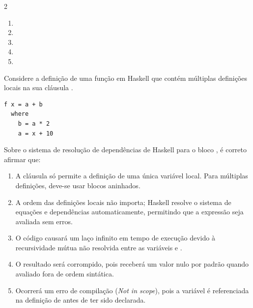 \documentclass[a4paper,10pt,brazil]{article}
\begin{document}
\begin{multicols}{2}
\begin{enumerate}
  \item {}

  \item {}

  \item {}
  \item {}

  \item {}


\end{enumerate}

Considere a definição de uma função  em Haskell que contém múltiplas definições locais na sua cláusula . 
\begin{verbatim}
f x = a + b
  where
    b = a * 2
    a = x + 10
\end{verbatim}
Sobre o sistema de resolução de dependências de Haskell para o bloco , é correto afirmar que:

\begin{enumerate}
  \item A cláusula  só permite a definição de uma única variável local. Para múltiplas definições, deve-se usar blocos  aninhados.

  \item A ordem das definições locais não importa; Haskell resolve o sistema de equações e dependências automaticamente, permitindo que a expressão seja avaliada sem erros.

  \item O código causará um laço infinito em tempo de execução devido à recursividade mútua não resolvida entre as variáveis  e .

  \item O resultado será corrompido, pois  receberá um valor nulo por padrão quando avaliado fora de ordem sintática.

  \item Ocorrerá um erro de compilação (\emph{Not in scope}), pois a variável  é referenciada na definição de  antes de ter sido declarada.


\end{enumerate}


\end{multicols}
\end{document}
